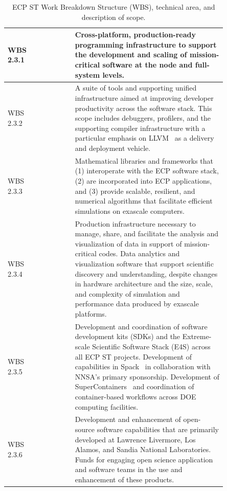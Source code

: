 \begin{table}[H]
	\begin{tabular}{|>{\columncolor[gray]{0.8}}p{0.10\linewidth}|>{\columncolor[rgb]{0.88,1,1}}p{0.15\linewidth}|p{0.6\linewidth}|}\hline
	    \vfill WBS 2.3.1\vfill & \vfill \centering{Programming Models and Runtimes} \vfill & \vfill Cross-platform, production-ready programming infrastructure to support the development and scaling of mission-critical software at the node and full-system levels.\vfill \\\hline
		\vfill WBS 2.3.2 \vfill & \vfill \centering{Development Tools} \vfill & \vfill A suite of tools and supporting unified infrastructure aimed at improving developer productivity across the software stack. This scope includes debuggers, profilers, and the supporting compiler infrastructure with a particular emphasis on LLVM~\cite{LLVM:2018} as a delivery and deployment vehicle. \vfill \\\hline
		\vfill WBS 2.3.3 \vfill & \vfill \centering{Mathematical Libraries} \vfill & \vfill Mathematical libraries and frameworks that (1) interoperate with the ECP software stack, (2) are incorporated into ECP applications, and (3) provide scalable, resilient, and numerical algorithms that facilitate efficient simulations on exascale computers.\vfill \\\hline
		\vfill WBS 2.3.4 \vfill & \vfill \centering{Data and Visualization} \vfill & \vfill Production infrastructure necessary to manage, share, and facilitate the analysis and visualization of data in support of mission-critical codes. Data analytics and visualization software that support scientific discovery and understanding, despite changes in hardware architecture and the size, scale, and complexity of simulation and performance data produced by exascale platforms. \vfill \\\hline
		\vfill WBS 2.3.5 \vfill & \vfill \centering{Software Ecosystem and Delivery} \vfill & \vfill Development and coordination of software development kits (SDKs) and the Extreme-scale Scientific Software Stack (E4S) across all ECP ST projects.  Development of capabilities in Spack~\cite{gamblin+:sc15} in collaboration with NNSA's primary sponsorship.  Development of SuperContainers~\cite{Supercontainers} and coordination of container-based workflows across DOE computing facilities.\vfill \\\hline
		\vfill WBS 2.3.6 \vfill & \vfill \centering{NNSA ST} \vfill & \vfill Development and enhancement of open-source software capabilities that are primarily developed at Lawrence Livermore, Los Alamos, and Sandia National Laboratories.  Funds for engaging open science application and software teams in the use and enhancement of these products.\vfill \\\hline
	\end{tabular}
	\caption{\label{table:wbs} ECP ST Work Breakdown Structure (WBS), technical area, and description of scope.}
\end{table}


